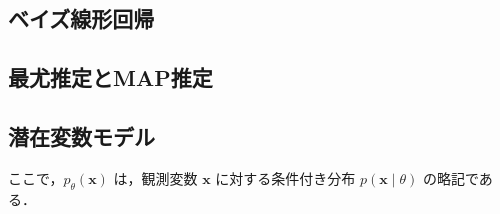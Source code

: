 \documentclass[titlepage]{ltjsbook}
\begin{document}
\subsection{ベイズ線形回帰}

\subsection{最尤推定とMAP推定}

\subsection{潜在変数モデル}
ここで，$p_\theta(\mathbf{x})$ は，観測変数 $\mathbf{x}$ に対する条件付き分布 $p(\mathbf{x} \mid \theta)$ の略記である．

\begin{comment}
観測データがある確率的な生成過程に従って生じたと仮定し，その過程を表現するために，パラメータ $\theta$ をもつ確率密度関数 $p_\theta(\mathbf{x})$ を導入する．ここで，$p_\theta(\mathbf{x})$ は，観測変数 $\mathbf{x}$ に対する条件付き分布 $p(\mathbf{x} \mid \theta)$ の略記である．このような分布 $p_\theta(\mathbf{x})$ を定めるモデルを，生成モデル (generative model) と呼ぶ．

確率的生成モデル (probabilistic generative model) では，この仮説に基づいて，

と呼ぶ。ここで $p_{\mathrm{data}}(\cdot)$ は真の確率密度関数とも呼ばれるが、あくまで仮説であり、実際にそのような分布が存在することが保証されているわけではない。

確率的生成モデルの目的は、観測データの生成過程を確率的に記述することである。学習対象となる観測データを $\mathbf{x} \in \mathbb{R}^d$ とし、それが従う真の確率密度関数を $p_{\mathrm{data}}(\cdot)$ と表す。この密度関数は、実世界においてデータがどのように生成されるかを記述し、ある観測 $\mathbf{x}$ に対する確率密度は $p_{\mathrm{data}}(\mathbf{x})$ で与えられる。もし $p_{\mathrm{data}}(\cdot)$ が既知であれば、任意のサンプル $\mathbf{x}$ をそこから直接生成（サンプリング）できるが、現実にはこの分布はほとんどの場合未知である。

そこで、観測データがある確率的生成過程に従って生じたと仮定し、その過程を記述するためにパラメータ $\theta$ をもつ確率密度関数 $p_\theta(\mathbf{x})$ を導入する。ここで $p_\theta(\mathbf{x})$ は観測変数 $\mathbf{x}$ に対する条件付き分布 $p(\mathbf{x} \mid \theta)$ の略記である。このように、$p_\theta(\mathbf{x})$ によって観測データの生成過程をモデル化し、新たなデータを生成できるようにしたものを生成モデル (generative model) と呼ぶ。




\end{comment}
\end{document}
